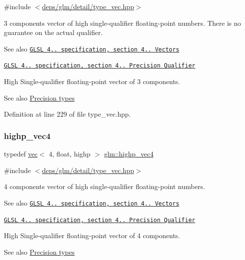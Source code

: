 {\ttfamily \#include $<$\hyperlink{type__vec_8hpp}{deps/glm/detail/type\+\_\+vec.\+hpp}$>$}

3 components vector of high single-\/qualifier floating-\/point numbers. There is no guarantee on the actual qualifier.

\begin{DoxySeeAlso}{See also}
\href{http://www.opengl.org/registry/doc/GLSLangSpec.4.20.8.pdf}{\tt G\+L\+SL 4.. specification, section 4.. Vectors} 

\href{http://www.opengl.org/registry/doc/GLSLangSpec.4.20.8.pdf}{\tt G\+L\+SL 4.. specification, section 4.. Precision Qualifier}
\end{DoxySeeAlso}
High Single-\/qualifier floating-\/point vector of 3 components. \begin{DoxySeeAlso}{See also}
\hyperlink{group__core__precision}{Precision types} 
\end{DoxySeeAlso}


Definition at line 229 of file type\+\_\+vec.\+hpp.

\mbox{\label{group__core__precision_ga27638826fa491205403b39198c49e9f5}} 
\subsubsection{\texorpdfstring{highp\+\_\+vec4}{highp\_vec4}}
{\footnotesize\ttfamily typedef \hyperlink{structglm_1_1vec}{vec}$<$ 4, float, highp $>$ \hyperlink{group__core__precision_ga27638826fa491205403b39198c49e9f5}{glm\+::highp\+\_\+vec4}}



{\ttfamily \#include $<$\hyperlink{type__vec_8hpp}{deps/glm/detail/type\+\_\+vec.\+hpp}$>$}

4 components vector of high single-\/qualifier floating-\/point numbers.

\begin{DoxySeeAlso}{See also}
\href{http://www.opengl.org/registry/doc/GLSLangSpec.4.20.8.pdf}{\tt G\+L\+SL 4.. specification, section 4.. Vectors} 

\href{http://www.opengl.org/registry/doc/GLSLangSpec.4.20.8.pdf}{\tt G\+L\+SL 4.. specification, section 4.. Precision Qualifier}
\end{DoxySeeAlso}
High Single-\/qualifier floating-\/point vector of 4 components. \begin{DoxySeeAlso}{See also}
\hyperlink{group__core__precision}{Precision types} 
\end{DoxySeeAlso}


